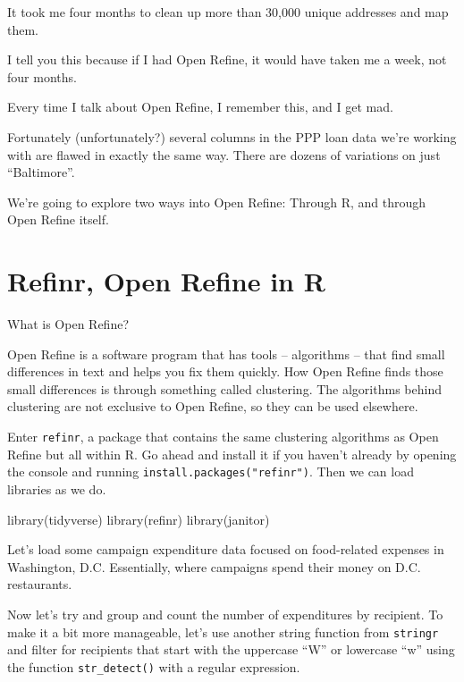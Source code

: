 \documentclass[
  letterpaper,
  DIV=11,
  numbers=noendperiod]{scrreprt}
\newenvironment{Shaded}{\begin{snugshade}}{\end{snugshade}}
\newcommand{\FunctionTok}[1]{\textcolor[rgb]{0.28,0.35,0.67}{#1}}
\newcommand{\NormalTok}[1]{\textcolor[rgb]{0.00,0.23,0.31}{#1}}
\begin{document}
It took me four months to clean up more than 30,000 unique addresses and
map them.

I tell you this because if I had Open Refine, it would have taken me a
week, not four months.

Every time I talk about Open Refine, I remember this, and I get mad.

Fortunately (unfortunately?) several columns in the PPP loan data we're
working with are flawed in exactly the same way. There are dozens of
variations on just ``Baltimore''.

We're going to explore two ways into Open Refine: Through R, and through
Open Refine itself.

\hypertarget{refinr-open-refine-in-r}{%
\section{Refinr, Open Refine in R}\label{refinr-open-refine-in-r}}

What is Open Refine?

Open Refine is a software program that has tools -- algorithms -- that
find small differences in text and helps you fix them quickly. How Open
Refine finds those small differences is through something called
clustering. The algorithms behind clustering are not exclusive to Open
Refine, so they can be used elsewhere.

Enter \texttt{refinr}, a package that contains the same clustering
algorithms as Open Refine but all within R. Go ahead and install it if
you haven't already by opening the console and running
\texttt{install.packages("refinr")}. Then we can load libraries as we
do.

\begin{Shaded}
\begin{Highlighting}[]
\FunctionTok{library}\NormalTok{(tidyverse)}
\FunctionTok{library}\NormalTok{(refinr)}
\FunctionTok{library}\NormalTok{(janitor)}
\end{Highlighting}
\end{Shaded}

Let's load some campaign expenditure data focused on food-related
expenses in Washington, D.C. Essentially, where campaigns spend their
money on D.C. restaurants.

Now let's try and group and count the number of expenditures by
recipient. To make it a bit more manageable, let's use another string
function from \texttt{stringr} and filter for recipients that start with
the uppercase ``W'' or lowercase ``w'' using the function
\texttt{str\_detect()} with a regular expression.
\end{document}
